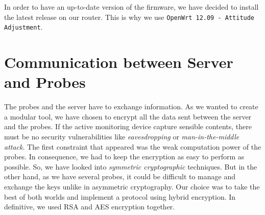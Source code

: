 In order to have an up-to-date version of the firmware, we have decided to install the latest release on our router. This is why we use \texttt{OpenWrt 12.09 - Attitude Adjustment}.





\section{Communication between Server and Probes}
The probes and the server have to exchange information. As we wanted to create a modular tool, we have chosen to encrypt all the data sent between the server and the probes. If the active monitoring device capture sensible contents, there must be no security vulnerabilities like \emph{eavesdropping} or \emph{man-in-the-middle attack}.
The first constraint that appeared was the weak computation power of the probes. In consequence, we had to keep the encryption as easy to perform as possible. So, we have looked into \emph{symmetric cryptographic} techniques. But in the other hand, as we have several probes, it could be difficult to manage and exchange the keys unlike in asymmetric cryptography. Our choice was to take the best of both worlds and implement a protocol using hybrid encryption.
In definitive, we used RSA and AES encryption together.

